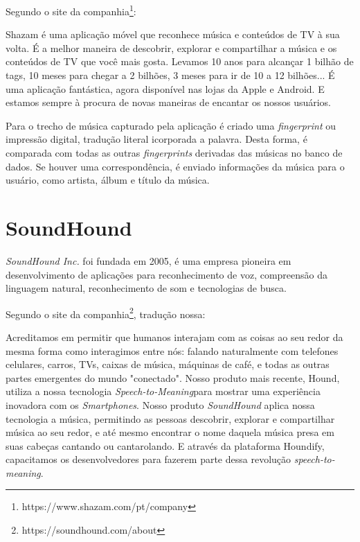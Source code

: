 Segundo o site da companhia\footnote{https://www.shazam.com/pt/company}:
\begin{citation}
Shazam é uma aplicação móvel que reconhece música e conteúdos de TV à sua volta. É a melhor maneira de descobrir, explorar e compartilhar a música e os conteúdos de TV que você mais gosta. Levamos 10 anos para alcançar 1 bilhão de tags, 10 meses para chegar a 2 bilhões, 3 meses para ir de 10 a 12 bilhões... É uma aplicação fantástica, agora disponível nas lojas da Apple e Android. E estamos sempre à procura de novas maneiras de encantar os nossos usuários.
\end{citation}

Para o trecho de música capturado pela aplicação é criado uma \textit{fingerprint} ou impressão digital, tradução literal icorporada a palavra. Desta forma, é comparada com todas as outras \textit{fingerprints} derivadas das músicas no banco de dados. Se houver uma correspondência, é enviado informações da música para o usuário, como artista, álbum e título da música.

\section{SoundHound}
\textit{SoundHound Inc.} foi fundada em 2005, é uma empresa pioneira em desenvolvimento de aplicações para reconhecimento de voz, compreensão da linguagem natural, reconhecimento de som e tecnologias de busca.

Segundo o site da companhia\footnote{https://soundhound.com/about}, tradução nossa:

\begin{citation}
Acreditamos em permitir que humanos interajam com as coisas ao seu redor da mesma forma como interagimos entre nós: falando naturalmente com telefones celulares, carros, TVs, caixas de música, máquinas de café, e todas as outras partes emergentes do mundo "conectado". Nosso produto mais recente, Hound, utiliza a nossa tecnologia \textit{Speech-to-Meaning}\tm para mostrar uma experiência inovadora com os \textit{Smartphones}. Nosso produto \textit{SoundHound} aplica nossa tecnologia a música, permitindo as pessoas descobrir, explorar e compartilhar música ao seu redor, e até mesmo encontrar o nome daquela música presa em suas cabeças cantando ou cantarolando. E através da plataforma Houndify, capacitamos os desenvolvedores para fazerem parte dessa revolução \textit{speech-to-meaning}.
\end{citation}

